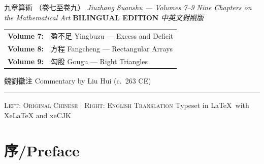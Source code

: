 \documentclass[11pt,a4paper]{article}
\begin{document}
\thispagestyle{empty}
\begin{center}
\vspace*{1.5cm}
{\fontsize{36}{44}\selectfont\color{titlecolor} 九章算術}
\vspace{0.5cm}
{\fontsize{18}{22}\selectfont\color{volcolor} （卷七至卷九）}
\vspace{0.3cm}
{\LARGE\itshape Jiuzhang Suanshu --- Volumes 7--9}
\vspace{0.4cm}
{\large\itshape Nine Chapters on the Mathematical Art}
\vspace{2cm}
{\LARGE\bfseries\color{sectioncolor} BILINGUAL EDITION}
\vspace{0.3cm}
{\large\itshape 中英文對照版}
\vspace{2cm}
\begin{tabular}{ll}
\textbf{Volume 7:} & 盈不足 Yingbuzu --- Excess and Deficit \\
\textbf{Volume 8:} & 方程 Fangcheng --- Rectangular Arrays \\
\textbf{Volume 9:} & 勾股 Gougu --- Right Triangles
\end{tabular}
\vspace{2cm}
{\Large 魏\quad 劉徽\quad 注}
\vspace{0.4cm}
{\large Commentary by Liu Hui (c.~263 CE)}
\vspace{1.5cm}
\rule{0.4\textwidth}{1pt}
\vspace{0.8cm}
{\small\textsc{Left: Original Chinese \quad | \quad Right: English Translation}}
\vspace{0.3cm}
{\small Typeset in LaTeX\ with XeLaTeX and xeCJK}
\end{center}

\newpage
\tableofcontents
\newpage

\section*{序\quad /\quad Preface}
\end{document}
